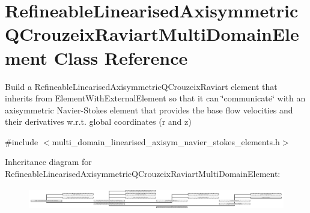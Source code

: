 \hypertarget{classRefineableLinearisedAxisymmetricQCrouzeixRaviartMultiDomainElement}{}\section{Refineable\+Linearised\+Axisymmetric\+Q\+Crouzeix\+Raviart\+Multi\+Domain\+Element Class Reference}
\label{classRefineableLinearisedAxisymmetricQCrouzeixRaviartMultiDomainElement}


Build a Refineable\+Linearised\+Axisymmetric\+Q\+Crouzeix\+Raviart element that inherits from Element\+With\+External\+Element so that it can \char`\"{}communicate\char`\"{} with an axisymmetric Navier-\/\+Stokes element that provides the base flow velocities and their derivatives w.\+r.\+t. global coordinates (r and z)  




{\ttfamily \#include $<$multi\+\_\+domain\+\_\+linearised\+\_\+axisym\+\_\+navier\+\_\+stokes\+\_\+elements.\+h$>$}

Inheritance diagram for Refineable\+Linearised\+Axisymmetric\+Q\+Crouzeix\+Raviart\+Multi\+Domain\+Element\+:\begin{figure}[H]
\begin{center}
\leavevmode
\includegraphics[height=0.985916cm]{classRefineableLinearisedAxisymmetricQCrouzeixRaviartMultiDomainElement}
\end{center}
\end{figure}
